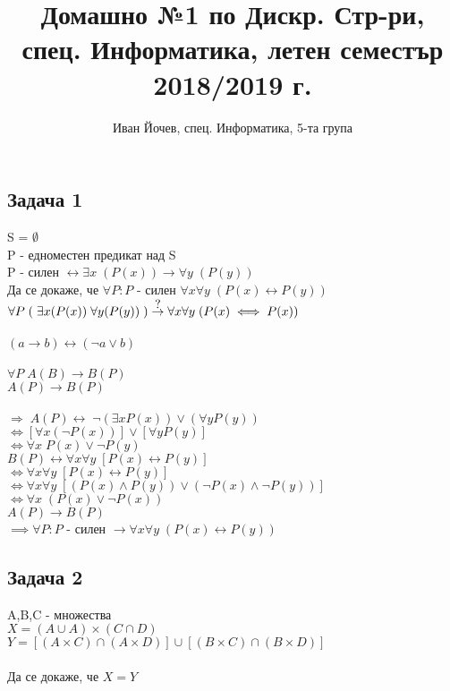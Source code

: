 \documentclass[10pt,a4paper]{article}
\title{Домашно №1 по Дискр. Стр-ри, спец. Информатика, летен семестър 2018/2019 г.}
\author{Иван Йочев, спец. Информатика, 5-та група}
\date{}
\newcommand\isimplies{\stackrel{\mathclap{\normalfont\mbox{?}}}{\rightarrow}}
\begin{document}
\maketitle

\subsection*{Задача 1}

S = $\emptyset$ \\
P - едноместен предикат над S \\
P - силен $\leftrightarrow \exists x\;(P(x)) \rightarrow \forall y\;(P(y))$ \\
Да се докаже, че $\forall P : P$ - силен $\forall x \forall y\;(P(x)\leftrightarrow P(y))$\\

$\forall P\;(\;\exists x(P(x)) \; \forall y(P(y))\;) \isimplies \forall x \forall y \; (P(x) \iff P(x))$ \\ \\
$(a \rightarrow b) \leftrightarrow (\neg a \lor b)$ \\ \\
$\forall P \; A(B) \rightarrow B(P)$ \\
$A(P) \rightarrow B(P)$ \\ \\
$\Rightarrow \; A(P) \leftrightarrow \; \neg (\exists x P(x)) \lor (\forall y P(y))$ \\
$\iff [\forall x(\neg P(x))] \lor [\forall y P(y)]$ \\
$\iff \forall x \; P(x) \lor \neg P(y)$ \\

$B(P) \leftrightarrow \forall x \forall y \; [P(x) \leftrightarrow P(y)]$\\
$\iff \forall x \forall y \; [P(x) \leftrightarrow P(y)]$ \\
$\iff \forall x \forall y \; [(P(x) \land P(y)) \lor (\neg P(x) \land \neg P(y))]$ \\
$\iff \forall x \; (P(x) \lor \neg P(x))$ \\

$A(P) \rightarrow B(P)$ \\
$\implies \forall P : P$ - силен $\rightarrow \forall x \forall y \; (P(x) \leftrightarrow P(y))$

\subsection*{Задача 2}
A,B,C - множества \\
$X = (A \cup A) \times (C \cap D)$ \\
$Y = [(A \times C)\cap(A \times D)] \cup [(B \times C) \cap (B \times D)]$ \\ \\
Да се докаже, че $X = Y$ \\
\end{document}
